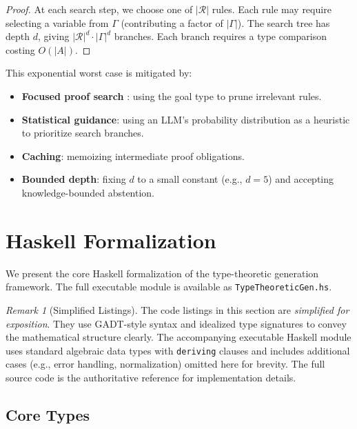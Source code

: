\documentclass[11pt,a4paper]{article}
\theoremstyle{plain}
\theoremstyle{definition}
\theoremstyle{remark}
\newtheorem{remark}[theorem]{Remark}
\begin{document}
\begin{proof}
At each search step, we choose one of $|\mathcal{R}|$ rules.
Each rule may require selecting a variable from $\Gamma$ (contributing a factor of $|\Gamma|$).
The search tree has depth $d$, giving $|\mathcal{R}|^d \cdot |\Gamma|^d$ branches.
Each branch requires a type comparison costing $O(|A|)$.
\end{proof}

This exponential worst case is mitigated by:
\begin{itemize}[nosep]
  \item \textbf{Focused proof search} \cite{liang2009}: using the goal type to prune irrelevant rules.
  \item \textbf{Statistical guidance}: using an LLM's probability distribution as a heuristic to prioritize search branches.
  \item \textbf{Caching}: memoizing intermediate proof obligations.
  \item \textbf{Bounded depth}: fixing $d$ to a small constant (e.g., $d = 5$) and accepting knowledge-bounded abstention.
\end{itemize}


\section{Haskell Formalization}\label{sec:haskell}

We present the core Haskell formalization of the type-theoretic generation framework.
The full executable module is available as \texttt{TypeTheoreticGen.hs}.

\begin{remark}[Simplified Listings]\label{rem:simplified-listings}
The code listings in this section are \emph{simplified for exposition}.
They use GADT-style syntax and idealized type signatures to convey the mathematical structure clearly.
The accompanying executable Haskell module uses standard algebraic data types with \texttt{deriving} clauses and includes additional cases (e.g., error handling, normalization) omitted here for brevity.
The full source code is the authoritative reference for implementation details.
\end{remark}

\subsection{Core Types}
\end{document}
